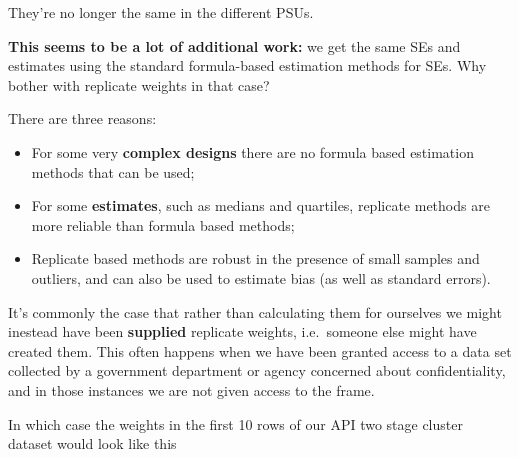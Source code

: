 \documentclass[
]{book}
\providecommand{\tightlist}{%
  \setlength{\itemsep}{0pt}\setlength{\parskip}{0pt}}
\begin{document}
They're no longer the same in the different PSUs.

\textbf{This seems to be a lot of additional work:} we get the same SEs and estimates
using the standard formula-based estimation methods for SEs. Why bother
with replicate weights in that case?

There are three reasons:

\begin{itemize}
\tightlist
\item
  For some very \textbf{complex designs} there are no formula based estimation methods
  that can be used;
\item
  For some \textbf{estimates}, such as medians and quartiles, replicate methods are
  more reliable than formula based methods;
\item
  Replicate based methods are robust in the presence of small samples and outliers,
  and can also be used to estimate bias (as well as standard errors).
\end{itemize}

It's commonly the case that rather than calculating them for ourselves we might
inestead have been \textbf{supplied} replicate weights, i.e.~someone else might have
created them. This often happens when we have been granted access
to a data set collected by a government department or agency concerned about
confidentiality, and in those instances we are not given access to the frame.

In which case the weights in the first 10 rows of our API two stage cluster dataset would look like this
\end{document}
